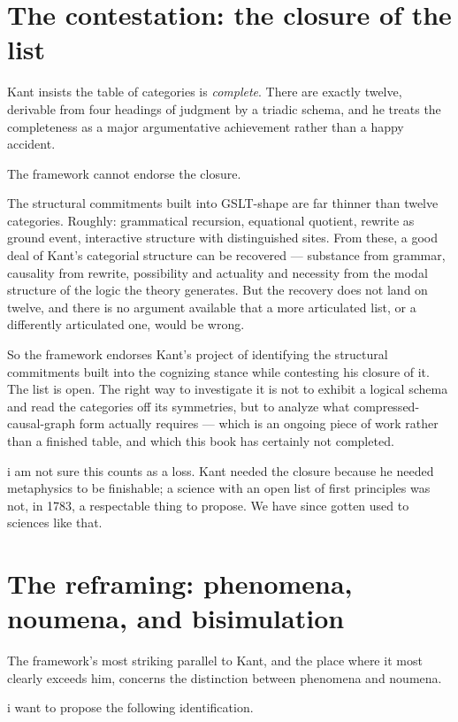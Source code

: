 \section{The contestation: the closure of the list}
\label{sec:kant-closure}

Kant insists the table of categories is \emph{complete}.
There are exactly twelve, derivable from four headings of judgment
by a triadic schema, and he treats the completeness as a major
argumentative achievement rather than a happy accident.

The framework cannot endorse the closure.

The structural commitments built into GSLT-shape are far thinner
than twelve categories.
Roughly: grammatical recursion, equational quotient, rewrite as
ground event, interactive structure with distinguished sites.
From these, a good deal of Kant's categorial structure can be
recovered --- substance from grammar, causality from rewrite,
possibility and actuality and necessity from the modal structure of
the logic the theory generates.
But the recovery does not land on twelve, and there is no argument
available that a more articulated list, or a differently
articulated one, would be wrong.

So the framework endorses Kant's project of identifying the
structural commitments built into the cognizing stance while
contesting his closure of it.
The list is open.
The right way to investigate it is not to exhibit a logical schema
and read the categories off its symmetries, but to analyze what
compressed-causal-graph form actually requires --- which is an
ongoing piece of work rather than a finished table, and which this
book has certainly not completed.

i am not sure this counts as a loss.
Kant needed the closure because he needed metaphysics to be
finishable; a science with an open list of first principles was not,
in 1783, a respectable thing to propose.
We have since gotten used to sciences like that.

\section{The reframing: phenomena, noumena, and bisimulation}
\label{sec:kant-noumena}

The framework's most striking parallel to Kant, and the place where
it most clearly exceeds him, concerns the distinction between
phenomena and noumena.

i want to propose the following identification.

